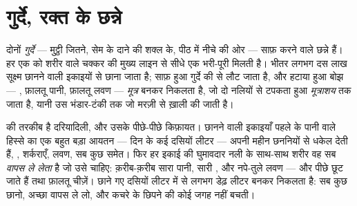 \section{गुर्दे, रक्त के छन्ने}

\begin{definition}[गुर्दे और मूत्र-तंत्र]\label{def:g7:removing-wastes:kidneys}
दोनों \emph{गुर्दे} --- मुट्ठी जितने, सेम के दाने की
शक्ल के, पीठ में नीचे की ओर ---  साफ़ करने वाले छन्ने हैं। हर एक को
शरीर वाले चक्कर की मुख्य लाइन से सीधे एक भरी-पूरी  मिलती है। भीतर
 लगभग दस लाख सूक्ष्म छानने वाली इकाइयों से छाना जाता है; साफ़
हुआ  गुर्दे की  से लौट जाता है, और हटाया हुआ बोझ --- ,
फ़ालतू पानी, फ़ालतू लवण --- \emph{मूत्र} बनकर निकलता है,
जो दो नलियों से टपकता हुआ \emph{मूत्राशय} तक जाता है,
यानी उस भंडार-टंकी तक जो मरज़ी से ख़ाली की जाती है।
\end{definition}

\begin{proposition}[छानो, फिर वापस लो]\label{prop:g7:removing-wastes:filter}
 की तरकीब है दरियादिली, और उसके पीछे-पीछे किफ़ायत। छानने वाली
इकाइयाँ पहले  के पानी वाले हिस्से का एक बहुत बड़ा आयतन --- दिन के
कई दसियों लीटर --- अपनी महीन छननियों से धकेल देती हैं, , शर्कराएँ,
लवण, सब कुछ समेत। फिर हर इकाई की घुमावदार नली के साथ-साथ शरीर वह सब
\emph{वापस ले लेता} है जो उसे चाहिए: क़रीब-क़रीब सारा पानी, सारी
, और नपे-तुले लवण --- और पीछे छूट जाते हैं  तथा फ़ालतू
चीज़ें। छाने गए दसियों लीटर में से लगभग डेढ़ लीटर  बनकर निकलता है:
सब कुछ छानो, अच्छा वापस ले लो, और कचरे के छिपने की कोई जगह नहीं बचती।
\end{proposition}
\admitted

